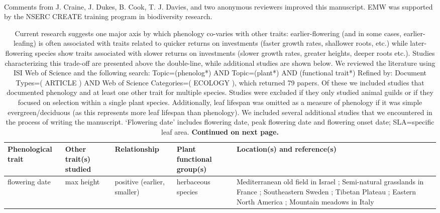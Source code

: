 \documentclass[11pt,a4paper,oneside]{article}
\begin{document}
\\
Comments from J. Craine, J. Dukes, B. Cook, T. J. Davies, and two anonymous reviewers improved this manuscript. EMW was supported by the NSERC CREATE training program in biodiversity research. 
\newpage

\newpage
\begin{center}  
\begin{table}
\caption{Current research suggests one major axis by which phenology co-varies with other traits: earlier-flowering (and in some cases, earlier-leafing) is often associated with traits related to quicker returns on investments (faster growth rates, shallower roots, etc.) while later-flowering species show traits associated with slower returns on investments (slower growth rates, greater heights, deeper roots etc.). Studies characterizing this trade-off are presented above the double-line, while additional studies are shown below. We reviewed the literature using ISI Web of Science and the following search: Topic=(phenolog*) AND Topic=(plant*) AND (functional trait*)
Refined by: Document Types=( ARTICLE ) AND Web of Science Categories=( ECOLOGY ), which returned 79 papers. Of these we included studies that documented phenology and at least one other trait for multiple species. Studies were excluded if they only studied animal guilds or if they focused on selection within a single plant species. Additionally, leaf lifespan was omitted as a measure of phenology if it was simple evergreen/deciduous (as this represents more leaf lifespan than phenology). We included several additional studies that we encountered in the process of writing the manuscript. `Flowering date' includes flowering date, peak flowering date and flowering onset date; SLA=specific leaf area. {\bf Continued on next page.}}
\vspace{1.5 pt}
\begin{minipage}{16cm}
\begin{tabular}{ | p{2cm} |  p{2.5 cm} | p{2.5 cm} | p{2.5 cm} | p{5cm} | }  \hline
Phenological trait & Other trait(s) studied  & Relationship & Plant functional group(s) & Location(s) and reference(s) \\ \hline \hline
flowering date	& max height & positive (earlier, smaller) & herbaceous species	& Mediterranean old field in Israel \citep{hadar1999}; Semi-natural grasslands in France \citep{Loualt2005,Vile:2006nc}; Southeastern Sweden \cite{Bolmgren:2008vo}; Tibetan Plateau \citep{du2010}; Eastern North America \citep{Sun:2011eu}; Mountain meadows in Italy \citep{Catorci2012} \\ \hline

\end{tabular}
\end{minipage}
\end{table}
\end{center}
\end{document}
